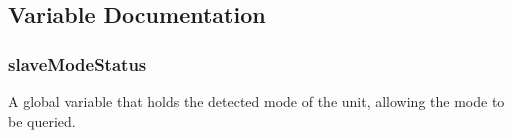\subsection{Variable Documentation}
\hypertarget{a00047_a0fdda7865dd9c0be0eb545cb8234865a}{
\subsubsection[{slave\-Mode\-Status}]{ slave\-Mode\-Status}}\label{a00047_a0fdda7865dd9c0be0eb545cb8234865a}
A global variable that holds the detected mode of the unit, allowing the mode to be queried. 